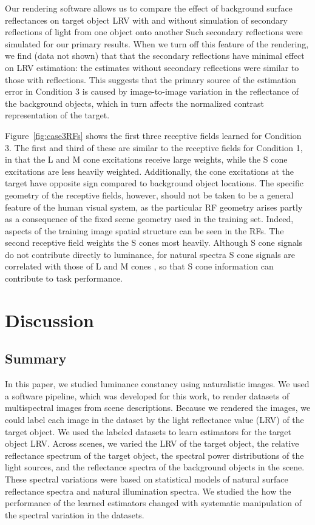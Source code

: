 \documentclass{jov}
\begin{document}
Our rendering software allows us to compare the effect of background surface reflectances on target object LRV with and without simulation of secondary reflections of light from one object onto another
Such secondary reflections were simulated for our primary results.
When we turn off this feature of the rendering, we find (data not shown) that 
that the secondary reflections have minimal effect on LRV estimation:
the estimates without secondary reflections were similar to those with reflections.
This suggests that the primary source of the estimation error in Condition 3 is caused by image-to-image variation in the reflectance of the background objects,
which in turn affects the normalized contrast representation of the target.

Figure~\ref{fig:case3RFs} shows the first three receptive fields learned for Condition 3.
The first and third of these are similar to the receptive fields for Condition 1, in that the L and M cone excitations receive large weights, while the S cone excitations are less heavily weighted. 
Additionally, the cone excitations at the target have opposite sign compared to background object locations.
The specific geometry of the receptive fields, however, should not be taken to be a general feature of the human visual system,
as the particular RF geometry arises partly as a consequence of the fixed scene geometry used in the training set.
Indeed, aspects of the training image spatial structure can be seen in the RFs.
The second receptive field weights the S cones most heavily.
Although S cone signals do not contribute directly to luminance, for natural spectra S cone signals are correlated with
those of L and M cones \cite{burton1987color, benson2014unsupervised}, so that S cone information can contribute to task performance.

\section{Discussion} \label{Discussion}

\subsection{Summary}
In this paper, we studied luminance constancy using naturalistic images.
We used a software pipeline, which was developed for this work, to render datasets of multispectral images from scene descriptions.
Because we rendered the images, we could label each image in the dataset by the light reflectance value (LRV) of the target object.
We used the labeled datasets to learn estimators for the target object LRV.
Across scenes, we varied the LRV of the target object, the relative reflectance spectrum of the target object, 
the spectral power distributions of the light sources, and the reflectance spectra of the background objects in the scene.
These spectral variations were based on statistical models of natural surface reflectance spectra and natural illumination spectra.
We studied the how the performance of the learned estimators changed with systematic manipulation of the spectral variation in the datasets.
\end{document}
